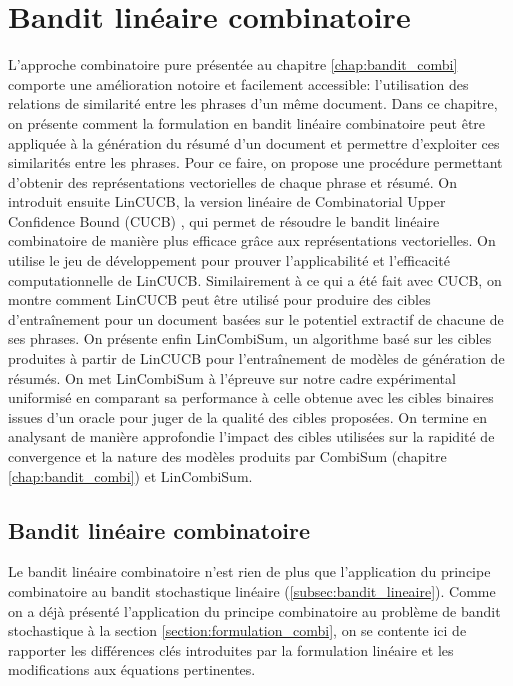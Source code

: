 \chapter{Bandit linéaire combinatoire}
\label{chap:bandit_combi_lin}                   %

L'approche combinatoire pure présentée au chapitre \ref{chap:bandit_combi} comporte 
une amélioration notoire et facilement accessible: l'utilisation des relations de 
similarité entre les phrases d'un même document.
Dans ce chapitre, on présente comment la formulation en bandit linéaire 
combinatoire \citep{NEURIPS2018_207f8801} peut être appliquée à la génération du résumé d'un document 
et permettre d'exploiter ces similarités entre les phrases.
Pour ce faire, on propose une procédure permettant d'obtenir 
des représentations vectorielles de chaque phrase et résumé.
On introduit ensuite LinCUCB, la version linéaire de Combinatorial Upper Confidence Bound (CUCB) 
\citep{pmlr-v28-chen13a}, qui permet de résoudre le bandit linéaire combinatoire 
de manière plus efficace grâce aux représentations vectorielles.
On utilise le jeu de développement pour prouver l'applicabilité
et l'efficacité computationnelle de LinCUCB.
Similairement à ce qui a été fait avec CUCB, on montre comment LinCUCB 
peut être utilisé pour produire des cibles d'entraînement pour un document 
basées sur le potentiel extractif de chacune de ses phrases.
On présente enfin LinCombiSum, un algorithme basé sur les cibles 
produites à partir de LinCUCB pour l'entraînement de modèles de génération de résumés.
On met LinCombiSum à l'épreuve sur notre cadre expérimental 
uniformisé en comparant sa performance à celle obtenue avec les cibles binaires
issues d'un oracle pour juger de la qualité des cibles proposées.
On termine en analysant de manière approfondie l'impact des cibles 
utilisées sur la rapidité de convergence et la nature des modèles 
produits par CombiSum (chapitre \ref{chap:bandit_combi}) et LinCombiSum.

\section{Bandit linéaire combinatoire}

Le bandit linéaire combinatoire n'est rien de plus que 
l'application du principe combinatoire
au bandit stochastique linéaire (\ref{subsec:bandit_lineaire}).
Comme on a déjà présenté l'application du principe combinatoire 
au problème de bandit stochastique à la section \ref{section:formulation_combi},
on se contente ici de rapporter les différences clés 
introduites par la formulation linéaire et les modifications
aux équations pertinentes.

